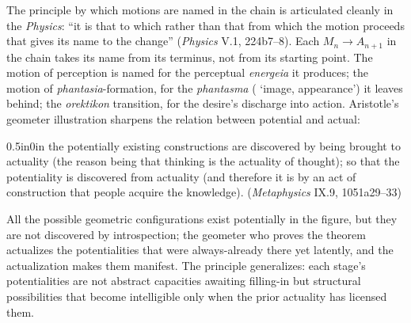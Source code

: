 The principle by which motions are named in the chain is articulated cleanly in the \textit{Physics}: ``it is that to which rather than that from which the motion proceeds that gives its name to the change'' (\textit{Physics} V.1, 224b7--8). Each $M_n \rightarrow A_{n+1}$ in the chain takes its name from its terminus, not from its starting point. The motion of perception is named for the perceptual \textit{energeia} it produces; the motion of \textit{phantasia}-formation, for the \textit{phantasma} ( `image, appearance') it leaves behind; the \textit{orektikon} transition, for the desire's discharge into action. Aristotle's geometer illustration sharpens the relation between potential and actual:
\begin{adjustwidth}{0.5in}{0in}
the potentially existing constructions are discovered by being brought to actuality (the reason being that thinking is the actuality of thought); so that the potentiality is discovered from actuality (and therefore it is by an act of construction that people acquire the knowledge). (\textit{Metaphysics} IX.9, 1051a29--33)
\end{adjustwidth}
All the possible geometric configurations exist potentially in the figure, but they are not discovered by introspection; the geometer who proves the theorem actualizes the potentialities that were always-already there yet latently, and the actualization makes them manifest. The principle generalizes: each stage's potentialities are not abstract capacities awaiting filling-in but structural possibilities that become intelligible only when the prior actuality has licensed them.

